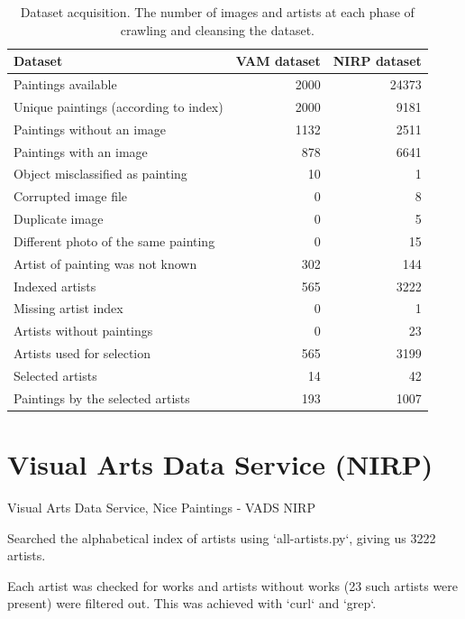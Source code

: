 \documentclass[11pt,a4paper,draft]{report}
\begin{document}
\begin{multicols}{2}
\begin{table}[ptb]
\centering
{}
\begin{tabular}{|l|rr|}
\toprule
Dataset & VAM dataset & NIRP dataset \\
\midrule
Paintings available                   & 2000 & 24373 \\
Unique paintings (according to index) & 2000 &  9181 \\
Paintings without an image            & 1132 &  2511 \\
Paintings with an image               &  878 &  6641 \\
Object misclassified as painting      &   10 &     1 \\
Corrupted image file                  &    0 &     8 \\
Duplicate image                       &    0 &     5 \\
Different photo of the same painting  &    0 &    15 \\
Artist of painting was not known      &  302 &   144 \\
\midrule
Indexed artists                       &  565 &  3222 \\
Missing artist index                  &    0 &     1 \\
Artists without paintings             &    0 &    23 \\
Artists used for selection            &  565 &  3199 \\
Selected artists                      &   14 &    42 \\
\midrule
Paintings by the selected artists     &  193 &  1007 \\
\bottomrule
\end{tabular}
\caption[Dataset acquisition]{Dataset acquisition.  The number of images and
artists at each phase of crawling and cleansing the dataset.}
\label{tab:crawl}
\end{table}

\section{Visual Arts Data Service (NIRP)}

Visual Arts Data Service, Nice Paintings - VADS NIRP

Searched the alphabetical index of artists using `all-artists.py`, giving us
3222 artists.

Each artist was checked for works and artists without works (23 such artists
were present) were filtered out.  This was achieved with `curl` and `grep`.


\end{multicols}
\end{document}
